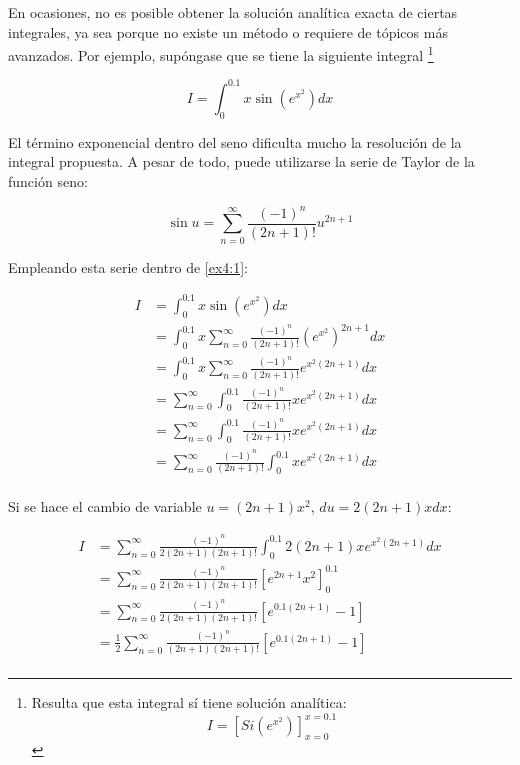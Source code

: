 \begin{ex}

	En ocasiones, no es posible obtener la solución analítica exacta de
	ciertas integrales, ya sea porque no existe un método o requiere de
	tópicos más avanzados. Por ejemplo, supóngase que se tiene la siguiente
	integral \footnote{ Resulta que esta integral sí tiene solución
	analítica: 
		\begin{equation*}
		I = \left[Si(e^{x^2})\right]_{x=0}^{x=0.1}
		\end{equation*}
	}

	\begin{equation}\label{ex4:1}
		I = \int_{0}^{0.1} x \sin(e^{x^2}) dx
	\end{equation}

	\begin{solution}

	El término exponencial dentro del seno dificulta mucho la resolución de
	la integral propuesta. A pesar de todo, puede utilizarse la serie de
	Taylor de la función seno:

	\begin{equation*}
		\sin u = \sum_{n = 0}^{\infty} \frac{(-1)^n}{(2n + 1)!} u^{2n +
		1}
	\end{equation*}

	Empleando esta serie dentro de \ref{ex4:1}:

	\begin{align*}
		I &= \int_{0}^{0.1} x \sin(e^{x^2}) dx \\
		  &= \int_{0}^{0.1} x \sum_{n = 0}^{\infty} \frac{(-1)^n}{(2n +
		  1)!} (e^{x^2})^{2n + 1} dx \\
		  &= \int_{0}^{0.1} x \sum_{n = 0}^{\infty} \frac{(-1)^n}{(2n +
		  1)!} e^{x^2(2n + 1)} dx \\
		  &= \sum_{n = 0}^{\infty} \int_{0}^{0.1} \frac{(-1)^n}{(2n +
		  1)!} x e^{x^2(2n + 1)} dx \\
		  &= \sum_{n = 0}^{\infty} \int_{0}^{0.1} \frac{(-1)^n}{(2n +
		  1)!} x e^{x^2(2n + 1)} dx \\
		  &= \sum_{n = 0}^{\infty} \frac{(-1)^n}{(2n + 1)!}
		  \int_{0}^{0.1} x e^{x^2(2n + 1)} dx \\
	\end{align*}

	Si se hace el cambio de variable $u = (2n + 1) x^2$, $du = 2(2n + 1)x dx$:

	\begin{align*}
		I &= \sum_{n = 0}^{\infty} \frac{(-1)^n}{2(2n + 1)(2n + 1)!}
		  \int_{0}^{0.1} 2(2n + 1) x e^{x^2(2n + 1)} dx \\
		  &= \sum_{n = 0}^{\infty} \frac{(-1)^n}{2(2n + 1)(2n + 1)!}
		  \left[e^{2n + 1}x^2 \right]_{0}^{0.1}\\
		  &= \sum_{n = 0}^{\infty} \frac{(-1)^n}{2(2n + 1)(2n + 1)!}
		  \left[e^{0.1(2n + 1)} - 1 \right]\\
		  &= \frac{1}{2} \sum_{n = 0}^{\infty} \frac{(-1)^n}{(2n + 1)(2n
		  + 1)!} \left[e^{0.1(2n + 1)} - 1 \right]\\
	\end{align*}


\end{solution}
\end{ex}
